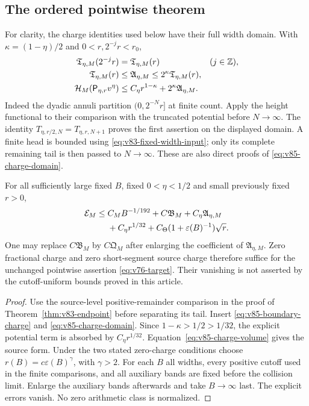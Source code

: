 \subsection{The ordered pointwise theorem}
For clarity, the charge identities used below have their full width
domain. With $\kappa=(1-\eta)/2$ and $0<r,2^{-j}r<r_0$,
\begin{align}
 \mathfrak T_{\eta,M}(2^{-j}r)&=\mathfrak T_{\eta,M}(r)
                   &&(j\in\mathbb Z),\notag\\
 \mathfrak T_{\eta,M}(r)&\le\mathfrak A_{\eta,M}
                    \le2^\kappa\mathfrak T_{\eta,M}(r),\notag\\
 \mathcal H_M(\mathsf P_{\eta,r}v^\eta)
       &\le C_\eta r^{1-\kappa}+2^\kappa\mathfrak A_{\eta,M}.
                                             \label{eq:v85-charge-domain}
\end{align}
Indeed the dyadic annuli partition $(0,2^{-N}r]$ at finite count.
Apply the height functional to their comparison with the truncated
potential before $N\to\infty$. The identity
$T_{\eta,r/2,N}=T_{\eta,r,N+1}$ proves the first assertion on the
displayed domain. A finite head is bounded using
\eqref{eq:v83-fixed-width-input}; only its complete remaining tail
is then passed to $N\to\infty$. These are also direct proofs of
\eqref{eq:v85-charge-domain}.

\begin{theorem}
\label{thm:v85-endpoint}
For all sufficiently large fixed $B$, fixed $0<\eta<1/2$ and small
previously fixed $r>0$,
\begin{align}
 \mathcal E_M\le{}&C_MB^{-1/192}+C\mathfrak B_M
                  +C_\eta\mathfrak A_{\eta,M}\notag\\
 &+C_\eta r^{1/32}
                  +C_\Theta(1+\varepsilon(B)^{-1})\sqrt r.
                                             \label{eq:v85-endpoint}
\end{align}
One may replace $C\mathfrak B_M$ by $C\mathfrak Q_M$ after enlarging
the coefficient of $\mathfrak A_{\eta,M}$. Zero fractional charge and
zero short-segment source charge therefore suffice for the unchanged
pointwise assertion \eqref{eq:v76-target}. Their vanishing is not
asserted by the cutoff-uniform bounds proved in this article.
\end{theorem}
\begin{proof}
Use the source-level positive-remainder comparison in the proof of
Theorem~\ref{thm:v83-endpoint} before separating its tail. Insert
\eqref{eq:v85-boundary-charge} and \eqref{eq:v85-charge-domain}.
Since $1-\kappa>1/2>1/32$, the explicit potential term is absorbed
by $C_\eta r^{1/32}$. Equation~\eqref{eq:v85-charge-volume} gives
the source form. Under the two stated zero-charge conditions choose
$r(B)=c\varepsilon(B)^\gamma$, with $\gamma>2$. For each $B$ all
widths, every positive cutoff used in the finite comparisons, and
all auxiliary bands are fixed before the collision limit. Enlarge
the auxiliary bands afterwards and take $B\to\infty$ last. The
explicit errors vanish. No zero arithmetic class is normalized.
\end{proof}

